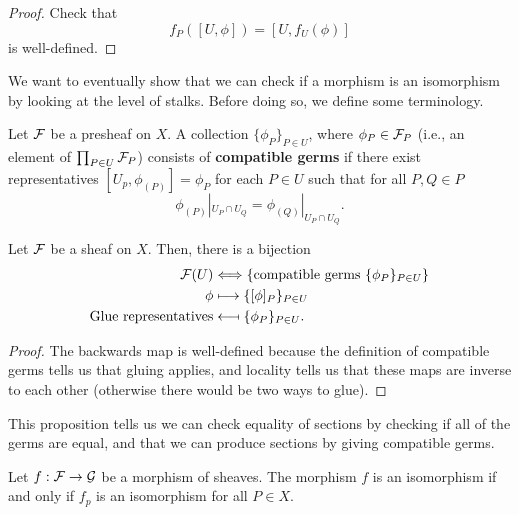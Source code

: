 \documentclass[12pt]{article}
\begin{document}
\begin{proof}
    Check that
    \[f_P([U,\phi]) = [U,f_U(\phi)]\]
    is well-defined.
\end{proof}

We want to eventually show that we can check if a morphism is an isomorphism by looking at the level of stalks. Before doing so, we define some terminology.

\begin{defn}
    Let $\mathcal{F}$ be a presheaf on $X$. A collection $\{\phi_P\}_{P\in U}$, where $\phi_P\in \cF_P$ (i.e., an element of $\prod_{P\in U} \mathcal{F}_P$) consists of \textbf{compatible germs} if there exist representatives $[U_p, \phi_{(P)}] = \phi_P$ for each $P\in U$ such that for all $P,Q\in P$
    \[\phi_{(P)}|_{U_P\cap U_Q} = \phi_{(Q)}|_{U_P\cap U_Q}.\]
\end{defn}

\begin{prop}\label{compgerms}
    Let $\mathcal{F}$ be a sheaf on $X$. Then, there is a bijection
    \begin{align*}
        \cF(U) &\Longleftrightarrow \{\text{compatible germs } \{\phi_P\}_{P\in U}\}\\
        \phi &\longmapsto \{[\phi]_P\}_{P\in U}\\
        \text{Glue representatives} &\longmapsfrom \{\phi_P\}_{P\in U}.
    \end{align*}
\end{prop}

\begin{proof}
    The backwards map is well-defined because the definition of compatible germs tells us that gluing applies, and locality tells us that these maps are inverse to each other (otherwise there would be two ways to glue).
\end{proof}

\begin{rmk}
    This proposition tells us we can check equality of sections by checking if all of the germs are equal, and that we can produce sections by giving compatible germs.
\end{rmk}

\begin{prop}
    Let $f: \mathcal{F} \to \mathcal{G}$ be a morphism of sheaves. The morphism $f$ is an isomorphism if and only if $f_p$ is an isomorphism for all $P\in X$.
\end{prop}
\end{document}
